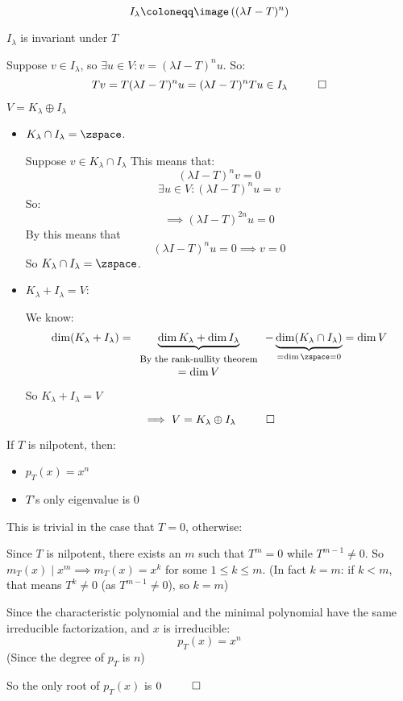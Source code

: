 \documentclass[10pt]{article}
\begin{document}
\begin{definition}

\[ I_\lambda \coloneqq \image\left((\lambda I - T)^n\right) \]

\end{definition}

\begin{lemma}{$I_\lambda$ is invariant under $T$}

Suppose $v\in I_\lambda$, so $\exists u\in V: v=(\lambda I - T)^nu$. So:
\[ Tv = T(\lambda I - T)^nu = (\lambda I - T)^nTu \in I_\lambda ~~ \qed \]

\end{lemma}

\begin{lemma}{$V=K_\lambda\oplus I_\lambda$}

\begin{itemize}
    \item $K_\lambda\cap I_\lambda=\zspace$.
    
    Suppose $v\in K_\lambda\cap I_\lambda$ This means that:
    \[ (\lambda I - T)^nv = 0 \]
    \[ \exists u\in V: (\lambda I - T)^nu = v \]
    So:
    \[ \implies (\lambda I - T)^{2n}u = 0 \]
    By  this means that 
    \[ (\lambda I - T)^nu = 0 \implies v=0 \]
    So $K_\lambda\cap I_\lambda = \zspace$.
    
    \item $K_\lambda+I_\lambda=V$:
    
    We know:
    \[ \dim(K_\lambda + I_\lambda) = \underbrace{\dim K_\lambda + \dim I_\lambda}_{\begin{array}{c} \text{\footnotesize By the rank-nullity theorem} \\ =\dim V \end{array}} - \underbrace{\dim(K_\lambda\cap I_\lambda)}_{=\dim\zspace=0} = \dim V \]
    So $K_\lambda+I_\lambda=V$
\end{itemize}

\[ \implies V = K_\lambda\oplus I_\lambda ~~ \qed \]

\end{lemma}

\begin{lemma}{If $T$ is nilpotent, then:
\begin{itemize}
    \item $p_T(x)=x^n$
    \item $T$'s only eigenvalue is $0$
\end{itemize}}

This is trivial in the case that $T=0$, otherwise:

Since $T$ is nilpotent, there exists an $m$ such that $T^m=0$ while $T^{m-1}\neq0$. So $m_T(x)\mid x^m \implies m_T(x)=x^k$ for some $1\leq k\leq m$. (In fact $k=m$: if $k<m$, that means $T^k\neq0$ (as $T^{m-1}\neq0$), so $k=m$)

Since the characteristic polynomial and the minimal polynomial have the same irreducible factorization, and $x$ is irreducible:
\[ p_T(x)=x^n \]
(Since the degree of $p_T$ is $n$)

So the only root of $p_T(x)$ is $0 ~~ \qed$

\end{lemma}
\end{document}
